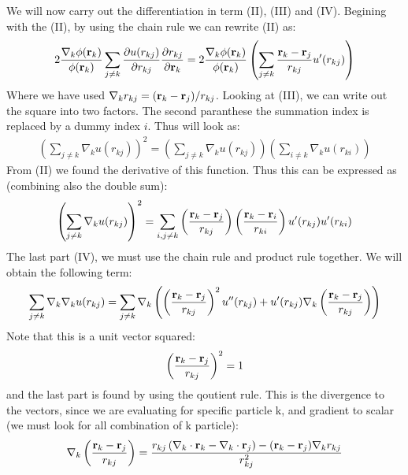 \documentclass[a4paper, 10pt]{article}
\begin{document}
We will now carry out the differentiation in term (II), (III) and (IV). Begining with the
(II), by using the chain rule we can rewrite (II) as:
\begin{align*}
2\frac{\nabla_{k}\phi(\bold{r}_{k})}{\phi{(\bold{r}_{k})}}\sum_{j\neq k}\pdv{u(r_{kj})}{r_{kj}}\pdv{r_{kj}}{\bold{r}_{k}} =
2\frac{\nabla_{k}\phi(\bold{r}_{k})}{\phi{(\bold{r}_{k})}}\left(\sum_{j\neq k}\frac{\bold{r}_{k} - \bold{r}_{j}}{r_{kj}}u'(r_{kj})\right)
\end{align*}
Where we have used $\nabla_{k} r_{kj} = (\bold{r}_{k} - \bold{r}_{j})/r_{kj}$.
Looking at (III), we can write out the square into two factors. The second paranthese the summation index is replaced by a
dummy index $i$. Thus will look as:
\begin{align}
  \left(\sum_{j\neq k}\nabla_{k} u(r_{kj})\right)^2 = \left(\sum_{j\neq k}\nabla_{k} u(r_{kj})\right)\left(\sum_{i\neq k}\nabla_{k} u(r_{ki})\right)
\end{align}
From (II) we found the derivative of this function. Thus this can be expressed as (combining also the double sum):
\begin{align}
  \left(\sum_{j\neq k}\nabla_{k} u(r_{kj})\right)^2 =
  \sum_{i, j\neq k}\left(\frac{\bold{r}_{k} - \bold{r}_{j}}{r_{kj}}\right)
  \left(\frac{\bold{r}_{k} - \bold{r}_{i}}{r_{ki}}\right)u'(r_{kj})u'(r_{ki})
\end{align}
The last part (IV), we must use the chain rule and product rule together. We will obtain
the following term:
\begin{align}
  \sum_{j \neq k}\nabla_{k}\nabla_{k}u(r_{kj}) =
  \sum_{j \neq k}\nabla_{k}\left(
  \left(\frac{\bold{r}_{k} - \bold{r}_{j}}{r_{kj}}\right)^2 u''(r_{kj}) + u'(r_{kj})\nabla_{k}
  \left(\frac{\bold{r}_{k} - \bold{r}_{j}}{r_{kj}}\right)\right)
\end{align}
Note that this is a unit vector squared:
\begin{align}
  \left(\frac{\bold{r}_{k} - \bold{r}_{j}}{r_{kj}}\right)^2 = 1
\end{align}
and the last part is found by using the qoutient rule. This is the divergence to the vectors, since we are evaluating for
specific particle k, and gradient to scalar (we must look for all combination of k particle):
\begin{align}
  \nabla_{k}
  \left(\frac{\bold{r}_{k} - \bold{r}_{j}}{r_{kj}}\right)
  = \frac{r_{kj}\left(\nabla_{k}\cdot\bold{r}_{k}-
  \nabla_{k}\cdot\bold{r}_{j}\right) -
  (\bold{r}_{k}-\bold{r}_{j})\nabla_{k}r_{kj}}{r_{kj}^2}
\end{align}
\end{document}
